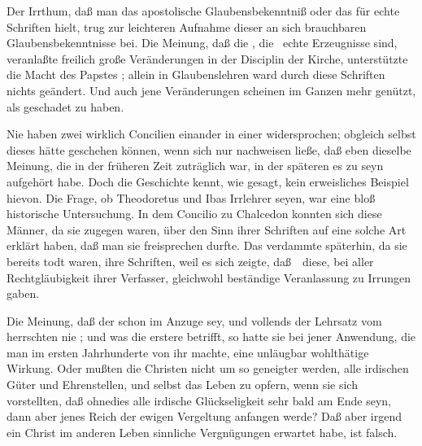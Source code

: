 \begin{aufza}
\item Der Irrthum, daß man das apostolische Glaubensbekenntniß oder das  für echte Schriften hielt, trug zur leichteren Aufnahme dieser an sich brauchbaren Glaubensbekenntnisse bei. Die Meinung, daß die , die  \udgl\  echte Erzeugnisse sind, veranlaßte freilich große Veränderungen in der Disciplin der Kirche, unterstützte die Macht des Papstes \usw ; allein in Glaubenslehren ward durch diese Schriften nichts geändert. Und auch jene Veränderungen scheinen im Ganzen mehr genützt, als geschadet zu haben.
\item Nie haben zwei wirklich  Concilien einander in einer  widersprochen; obgleich selbst dieses hätte geschehen können, wenn sich nur nachweisen ließe, daß eben dieselbe Meinung, die in der früheren Zeit zuträglich war, in der späteren es zu seyn aufgehört habe. Doch die Geschichte kennt, wie gesagt, kein erweisliches Beispiel hievon. Die Frage, ob Theodoretus und Ibas Irrlehrer seyen, war eine bloß historische Untersuchung. In dem Concilio zu Chalcedon konnten sich diese Männer, da sie zugegen waren, über den Sinn ihrer Schriften auf eine solche Art erklärt haben, daß man sie freisprechen durfte. Das  verdammte späterhin, da sie bereits todt waren, ihre Schriften, weil es sich zeigte, daß~\ diese, bei aller Rechtgläubigkeit ihrer Verfasser, gleichwohl beständige Veranlassung zu Irrungen gaben.
\item Die Meinung, daß der  schon im Anzuge sey, und vollends der Lehrsatz vom  herrschten nie ; und was die erstere betrifft, so hatte sie bei jener Anwendung, die man im ersten Jahrhunderte von ihr machte, eine unläugbar wohlthätige Wirkung. Oder mußten die Christen nicht um so geneigter werden, alle irdischen Güter und Ehrenstellen, und selbst das Leben zu opfern, wenn sie sich vorstellten, daß ohnedies alle irdische Glückseligkeit sehr bald am Ende seyn, dann aber jenes Reich der ewigen Vergeltung anfangen werde? Daß aber irgend ein  Christ im anderen Leben sinnliche Vergnügungen erwartet habe, ist falsch.

\end{aufza}
